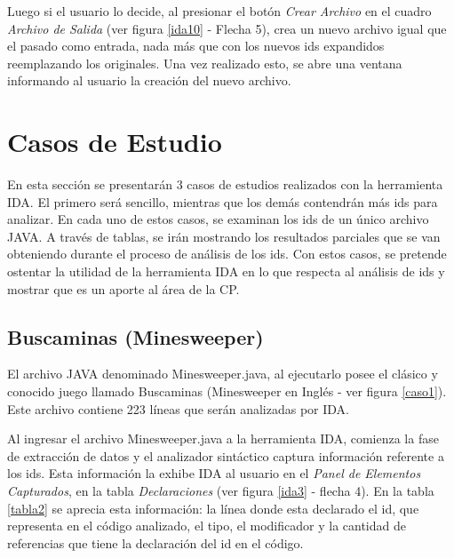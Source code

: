 Luego si el usuario lo decide, al presionar el botón \textit{Crear Archivo} en el cuadro \textit{Archivo de Salida} (ver figura \ref{ida10} - Flecha 5), crea un nuevo archivo igual que el pasado como entrada, nada más que con los nuevos ids expandidos reemplazando los originales. Una vez realizado esto, se abre una ventana informando al usuario la creación del nuevo archivo.


\section{Casos de Estudio}

En esta sección se presentarán 3 casos de estudios realizados con la herramienta IDA. El primero será sencillo, mientras que los demás contendrán más ids para analizar. En cada uno de estos casos, se examinan los ids de un único archivo JAVA. A través de tablas, se irán mostrando los resultados parciales que se van obteniendo durante el proceso de análisis de los ids.
Con estos casos, se pretende ostentar la utilidad de la herramienta IDA en lo que respecta al análisis de ids y mostrar que es un aporte al área de la CP.

\subsection{Buscaminas (Minesweeper)}

El archivo JAVA denominado Minesweeper.java, al ejecutarlo posee el clásico y conocido juego llamado Buscaminas (Minesweeper en Inglés - ver figura \ref{caso1}). Este archivo contiene 223 líneas que serán analizadas por IDA.

Al ingresar el archivo Minesweeper.java a la herramienta IDA, comienza la fase de extracción de datos y el analizador sintáctico captura información referente a los ids. Esta información la exhibe IDA al usuario en el \textit{Panel de Elementos Capturados}, en la tabla \textit{Declaraciones} (ver figura \ref{ida3} - flecha 4). En la tabla  \ref{tabla2} se aprecia esta información: la línea donde esta declarado el id, que representa en el código analizado, el tipo, el modificador y la cantidad de referencias que tiene la declaración del id en el código.

